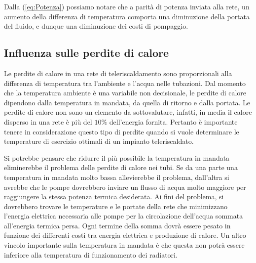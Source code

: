 \documentclass[laurea,oneside,11pt]{USiena_tesiLM}
\begin{document}
Dalla (\ref{eq:Potenza}) possiamo notare che a parità di potenza inviata alla rete, un aumento della differenza di temperatura comporta una diminuzione della portata del fluido, e dunque una diminuzione dei costi di pompaggio.


\subsection{Influenza sulle perdite di calore}
Le perdite di calore in una rete di teleriscaldamento sono proporzionali alla differenza di temperatura tra l'ambiente e l'acqua nelle tubazioni. Dal momento che la temperatura ambiente è una variabile non decisionale, le perdite di calore dipendono dalla temperatura in mandata, da quella di ritorno e dalla portata. Le perdite di calore non sono un elemento da sottovalutare, infatti, in media il calore disperso in una rete è più del $10\%$ dell'energia fornita. Pertanto è importante tenere in considerazione questo tipo di perdite quando si vuole determinare le temperature di esercizio ottimali di un impianto teleriscaldato.

Si potrebbe pensare che ridurre il più possibile la temperatura in mandata eliminerebbe il problema delle perdite di calore nei tubi. Se da una parte una temperatura in mandata molto bassa allevierebbe il problema, dall'altra si avrebbe che le pompe dovrebbero inviare un flusso di acqua molto maggiore per raggiungere la stessa potenza termica desiderata. Ai fini del problema, si dovrebbero trovare le temperature e le portate  della rete che minimizzano l'energia elettrica necessaria alle pompe per la circolazione dell'acqua sommata all'energia termica persa. Ogni termine della somma dovrà essere pesato 
in funzione dei differenti costi tra energia elettrica e produzione di calore.
Un altro vincolo importante sulla temperatura in mandata è che questa non potrà essere inferiore alla temperatura di funzionamento dei radiatori.  
\end{document}
